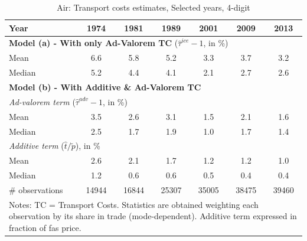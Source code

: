 \documentclass[a4paper,11pt]{article}
\begin{document}
\begin{table}[htbp]
  \centering
  \caption{Air: Transport costs estimates, Selected years, 4-digit}
\begin{center}
  \footnotesize{
    \begin{tabular}{l|cccccc}
   \hline\hline
Year & 1974  & 1981  & 1989  & 2001  & 2009  & 2013 \\ \hline
\multicolumn{7}{l}{\textbf{Model (a) - With only Ad-Valorem TC} ($\widehat{\tau}^{ice}-1$, in \%) }  \\
\hline
Mean  & 6.6 & 5.8 & 5.2 & 3.3 & 3.7 & 3.2 \\
Median & 5.2 & 4.4 & 4.1 & 2.1 & 2.7 & 2.6 \\
\hline
\multicolumn{7}{l}{\textbf{Model (b) - With Additive \& Ad-Valorem TC}}  \\ \hline
\multicolumn{7}{l}{\textit{Ad-valorem term }($\widehat{\tau}^{adv}-1$, in \%) }   \\ \hline
Mean  & 3.5 & 2.6 & 3.1 & 1.5 & 2.1 & 1.6  \\
Median & 2.5 & 1.7 & 1.9 & 1.0 & 1.7 & 1.4  \\
\hline
\multicolumn{7}{l}{\textit{Additive term} ($\widehat{t}/\widetilde{p}$), in \%}    \\ \hline
Mean  & 2.6 & 2.1 & 1.7 & 1.2 &1.2 & 1.0 \\
Median & 1.2 & 0.6 & 0.6 & 0.5 & 0.4 & 0.4  \\
\hline
\# observations & 14944 & 16844 & 25307 & \multicolumn{1}{c}{35005} & \multicolumn{1}{c}{38475} & \multicolumn{1}{c}{39460}  \\
\hline\hline
\multicolumn{7}{l}{\parbox[l]{11cm}{ \vspace{7pt}\scriptsize{Notes: TC = Transport Costs.
Statistics are obtained weighting each observation by its share in trade (mode-dependent).
Additive term expressed in fraction of fas price.}}}
\end{tabular}%
}
\end{center}
  \label{tab:result_air_rob}
\end{table}%
\end{document}
